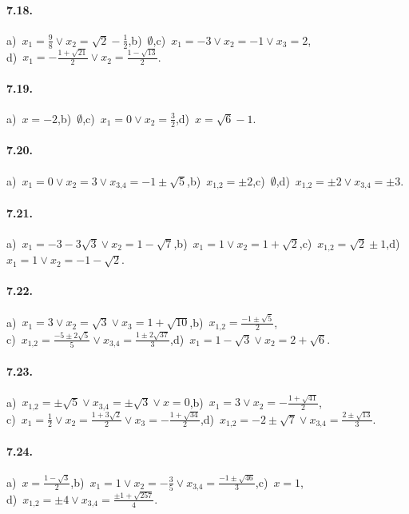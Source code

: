 \paragraph{7.18.} a)~$x_1=\frac 9 8\vee x_2=\sqrt 2-\frac 1 2$,\quad b)~$\emptyset $,\quad c)~$x_1=-3\vee x_2=-1\vee x_3=2$,\protect\\ d)~$x_1=-\frac{1+\sqrt{21}} 2\vee x_2=\frac{1-\sqrt{13}} 2$.

\paragraph{7.19.} a)~$x=-2$,\quad b)~$\emptyset $,\quad c)~$x_1=0\vee x_2=\frac 3 2$,\quad d)~$x=\sqrt 6-1$.

\paragraph{7.20.} a)~$x_1=0\vee x_2=3 \vee x_{3\text{,}4}=-1\pm \sqrt 5$,\quad b)~$x_{1\text{,}2}=\pm 2$,\quad c)~$\emptyset $,\quad d)~$x_{1\text{,}2}=\pm 2\vee x_{3\text{,}4}=\pm 3$.

\paragraph{7.21.} a)~$x_1=-3-3\sqrt 3\vee x_2=1-\sqrt 7$,\quad b)~$x_1=1\vee x_2=1+\sqrt 2$,\quad c)~$x_{1\text{,}2}=\sqrt 2\pm 1$,\quad d)~$x_1=1\vee x_2=-1-\sqrt 2$.

\paragraph{7.22.} a)~$x_1=3\vee x_2=\sqrt 3\vee x_3=1+\sqrt{10}$,\quad b)~$x_{1\text{,}2}=\frac{-1\pm \sqrt 5} 2$,\protect\\
\quad c)~$x_{1\text{,}2}=\frac{-5\pm 2\sqrt 5} 5\vee x_{3\text{,}4}=\frac{1\pm 2\sqrt{37}} 3$,\quad d)~$x_1=1-\sqrt 3\vee x_2=2+\sqrt 6$.

\paragraph{7.23.} a)~$x_{1\text{,}2}=\pm \sqrt 5\vee x_{3\text{,}4}=\pm \sqrt 3\vee x=0$,\quad b)~$x_1=3\vee x_2=-\frac{1+\sqrt{41}} 2$,\protect\\
\quad c)~$x_1=\frac 1 2\vee x_2=\frac{1+3\sqrt 2} 2\vee x_3=-\frac{1+\sqrt{34}} 2$,\quad d)~$x_{1\text{,}2}=-2\pm \sqrt 7\vee x_{3\text{,}4}=\frac{2\pm \sqrt{13}} 3$.

\paragraph{7.24.} a)~$x=\frac{1-\sqrt 3} 2$,\quad b)~$x_1=1\vee x_2=-\frac 3 5\vee x_{3\text{,}4}=\frac{-1\pm \sqrt{46}} 3$,\quad c)~$x=1$,\protect\\
\quad d)~$x_{1\text{,}2}=\pm 4\vee x_{3\text{,}4}=\frac{\pm 1+\sqrt{257}} 4$.

